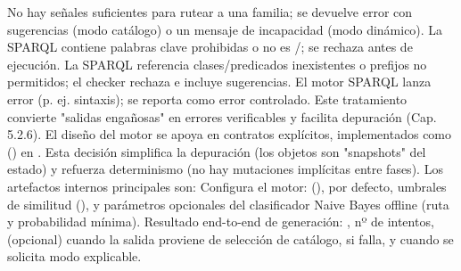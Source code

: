 {}\markdownRendererUlBeginTight
\markdownRendererUlItem {} No hay señales suficientes para rutear a una familia; se devuelve error con sugerencias (modo catálogo) o un mensaje de incapacidad (modo dinámico).\markdownRendererUlItemEnd 
\markdownRendererUlItem {} La SPARQL contiene palabras clave prohibidas o no es /; se rechaza antes de ejecución.\markdownRendererUlItemEnd 
\markdownRendererUlItem {} La SPARQL referencia clases/predicados inexistentes o prefijos no permitidos; el checker rechaza e incluye sugerencias.\markdownRendererUlItemEnd 
\markdownRendererUlItem {} El motor SPARQL lanza error (p. ej. sintaxis); se reporta como error controlado.\markdownRendererUlItemEnd 
\markdownRendererUlEndTight \markdownRendererInterblockSeparator
{}Este tratamiento convierte "salidas engañosas" en errores verificables y facilita depuración (Cap. 5.2.6).\markdownRendererInterblockSeparator
{}\markdownRendererInterblockSeparator
{}El diseño del motor se apoya en contratos explícitos, implementados como  () en . Esta decisión simplifica la depuración (los objetos son "snapshots" del estado) y refuerza determinismo (no hay mutaciones implícitas entre fases).\markdownRendererInterblockSeparator
{}Los artefactos internos principales son:\markdownRendererInterblockSeparator
{}\markdownRendererUlBeginTight
\markdownRendererUlItem {} Configura el motor:  (),  por defecto, umbrales de similitud (), y parámetros opcionales del clasificador Naive Bayes offline (ruta y probabilidad mínima).\markdownRendererUlItemEnd 
\markdownRendererUlItem {} Resultado end-to-end de generación: , nº de intentos, (opcional)  cuando la salida proviene de selección de catálogo,  si falla, y  cuando se solicita modo explicable.\markdownRendererUlItemEnd 
